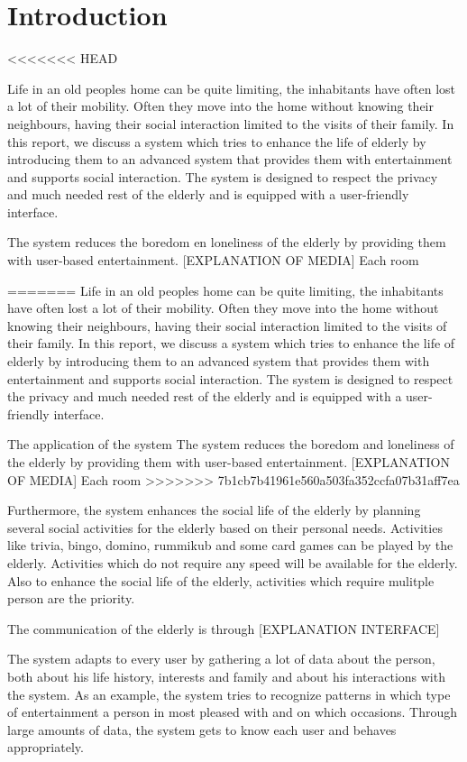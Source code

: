 \documentclass[12pt, a4paper]{article}
\begin{document}
\tableofcontents 
\newpage
\section{Introduction}
<<<<<<< HEAD


Life in an old peoples home can be quite limiting, the inhabitants have often lost a lot of their mobility. Often they move into the home without knowing their neighbours, having their social interaction limited to the visits of their family. In this report, we discuss a system which tries to enhance the life of elderly by introducing them to an advanced system that provides them with entertainment and supports social interaction. The system is designed to respect the privacy and much needed rest of the elderly and is equipped with a user-friendly interface.

The system reduces the boredom en loneliness of the elderly by providing them with user-based entertainment. [EXPLANATION OF MEDIA] Each room

=======
Life in an old peoples home can be quite limiting, the inhabitants have often lost a lot of their mobility. Often they move into the home without knowing their neighbours, having their social interaction limited to the visits of their family. In this report, we discuss a system which tries to enhance the life of elderly by introducing them to an advanced system that provides them with entertainment and supports social interaction. The system is designed to respect the privacy and much needed rest of the elderly and is equipped with a user-friendly interface.

The application of the system 
The system reduces the boredom and loneliness of the elderly by providing them with user-based entertainment. [EXPLANATION OF MEDIA] Each room
>>>>>>> 7b1cb7b41961e560a503fa352ccfa07b31aff7ea

Furthermore, the system enhances the social life of the elderly by planning several social activities for the elderly based on their personal needs. Activities like trivia, bingo, domino, rummikub and some card games can be played by the elderly. Activities which do not require any speed will be available for the elderly. Also to enhance the social life of the elderly, activities which require mulitple person are the priority.

The communication of the elderly is through [EXPLANATION INTERFACE]

The system adapts to every user by gathering a lot of data about the person, both about his life history, interests and family and about his interactions with the system. As an example, the system tries to recognize patterns in which type of entertainment a person in most pleased with and on which occasions. Through large amounts of data, the system gets to know each user and behaves appropriately.
\end{document}
